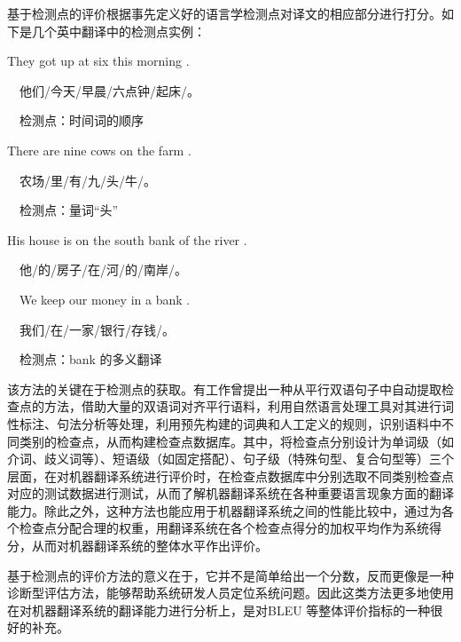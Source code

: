 \parinterval 基于检测点的评价根据事先定义好的语言学检测点对译文的相应部分进行打分。如下是几个英中翻译中的检测点实例：

\begin{example}
They got up at six this morning .

\qquad\ \ 他们/今天/早晨/六点钟/起床/。

\qquad\ \ 检测点：时间词的顺序
\label{eg:4-3}
\end{example}

\begin{example}
There are nine cows on the farm .

\qquad\ \ 农场/里/有/九/头/牛/。

\qquad\ \ 检测点：量词“头”
\label{eg:4-4}
\end{example}

\begin{example}
His house is on the south bank of the river .

\qquad\ \ 他/的/房子/在/河/的/南岸/。

\qquad\ \ We keep our money in a bank .

\qquad\ \ 我们/在/一家/银行/存钱/。

\qquad\ \ 检测点：bank 的多义翻译
\label{eg:4-5}
\end{example}

\parinterval 该方法的关键在于检测点的获取。有工作曾提出一种从平行双语句子中自动提取检查点的方法，借助大量的双语词对齐平行语料，利用自然语言处理工具对其进行词性标注、句法分析等处理，利用预先构建的词典和人工定义的规则，识别语料中不同类别的检查点，从而构建检查点数据库。其中，将检查点分别设计为单词级（如介词、歧义词等）、短语级（如固定搭配）、句子级（特殊句型、复合句型等）三个层面，在对机器翻译系统进行评价时，在检查点数据库中分别选取不同类别检查点对应的测试数据进行测试，从而了解机器翻译系统在各种重要语言现象方面的翻译能力。除此之外，这种方法也能应用于机器翻译系统之间的性能比较中，通过为各个检查点分配合理的权重，用翻译系统在各个检查点得分的加权平均作为系统得分，从而对机器翻译系统的整体水平作出评价。

\parinterval 基于检测点的评价方法的意义在于，它并不是简单给出一个分数，反而更像是一种诊断型评估方法，能够帮助系统研发人员定位系统问题。因此这类方法更多地使用在对机器翻译系统的翻译能力进行分析上，是对BLEU 等整体评价指标的一种很好的补充。


